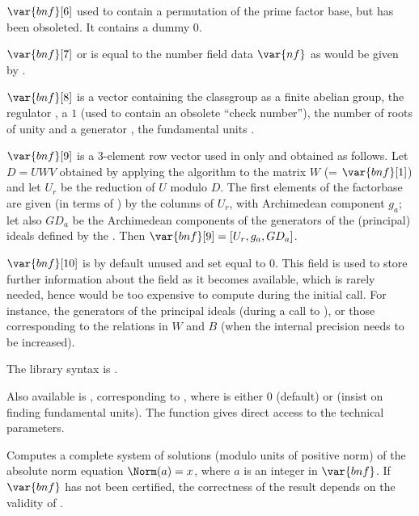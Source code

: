 $\var{bnf}[6]$ used to contain a permutation of the prime factor base, but
has been obsoleted. It contains a dummy $0$.

$\var{bnf}[7]$ or  is equal to the number field data
$\var{nf}$ as would be given by .

$\var{bnf}[8]$ is a vector containing the classgroup 
as a finite abelian group, the regulator , a $1$ (used to
contain an obsolete ``check number''), the number of roots of unity and a
generator , the fundamental units .

$\var{bnf}[9]$ is a 3-element row vector used in  only
and obtained as follows. Let $D = U W V$ obtained by applying the
 algorithm to the matrix $W$ (= $\var{bnf}[1]$) and
let $U_r$ be the reduction of $U$ modulo $D$. The first elements of the
factorbase are given (in terms of ) by the columns of $U_r$,
with Archimedean component $g_a$; let also $GD_a$ be the Archimedean
components of the generators of the (principal) ideals defined by the
. Then $\var{bnf}[9]=[U_r, g_a, GD_a]$.

$\var{bnf}[10]$ is by default unused and set equal to 0. This field is used
to store further information about the field as it becomes available, which
is rarely needed, hence would be too expensive to compute during the initial
 call. For instance, the generators of the principal ideals
 (during a call to ), or
those corresponding to the relations in $W$ and $B$ (when the 
internal precision needs to be increased).

The library syntax is .

Also available is ,
corresponding to , where
 is either $0$ (default) or  (insist on finding
fundamental units). The function
 gives direct access to the technical parameters.

\label{se:bnfisintnorm}
Computes a complete system of
solutions (modulo units of positive norm) of the absolute norm equation
$\Norm(a)=x$,
where $a$ is an integer in $\var{bnf}$. If $\var{bnf}$ has not been certified,
the correctness of the result depends on the validity of .

